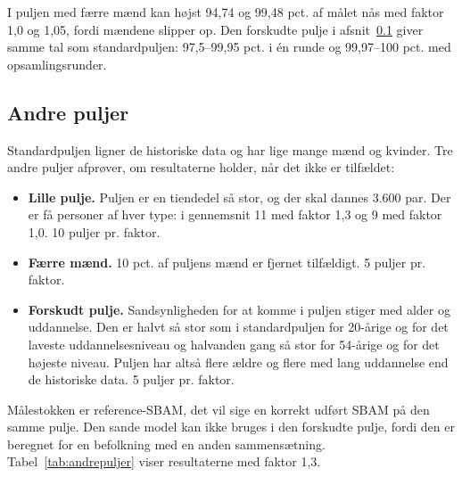\documentclass[11pt,a4paper]{article}
\begin{document}
I puljen med færre mænd kan højst 94,74 og 99,48 pct. af målet nås med faktor 1,0 og 1,05, fordi
mændene slipper op. Den forskudte pulje i afsnit~\ref{sec:andrepuljer} giver samme tal som
standardpuljen: 97,5--99,95 pct. i én runde og 99,97--100 pct. med opsamlingsrunder.

\subsection{Andre puljer}\label{sec:andrepuljer}

Standardpuljen ligner de historiske data og har lige mange mænd og kvinder. Tre andre puljer
afprøver, om resultaterne holder, når det ikke er tilfældet:

\begin{itemize}
\item \textbf{Lille pulje.} Puljen er en tiendedel så stor, og der skal dannes 3.600 par. Der er få
personer af hver type: i gennemsnit 11 med faktor 1,3 og 9 med faktor 1,0. 10 puljer pr. faktor.
\item \textbf{Færre mænd.} 10 pct. af puljens mænd er fjernet tilfældigt. 5 puljer pr. faktor.
\item \textbf{Forskudt pulje.} Sandsynligheden for at komme i puljen stiger med alder og uddannelse.
Den er halvt så stor som i standardpuljen for 20-årige og for det laveste uddannelsesniveau og
halvanden gang så stor for 54-årige og for det højeste niveau. Puljen har altså flere ældre og
flere med lang uddannelse end de historiske data. 5 puljer pr. faktor.
\end{itemize}

Målestokken er reference-SBAM, det vil sige en korrekt udført SBAM på den samme pulje. Den sande
model kan ikke bruges i den forskudte pulje, fordi den er beregnet for en befolkning med en anden
sammensætning. Tabel~\ref{tab:andrepuljer} viser resultaterne med faktor 1,3.
\end{document}
